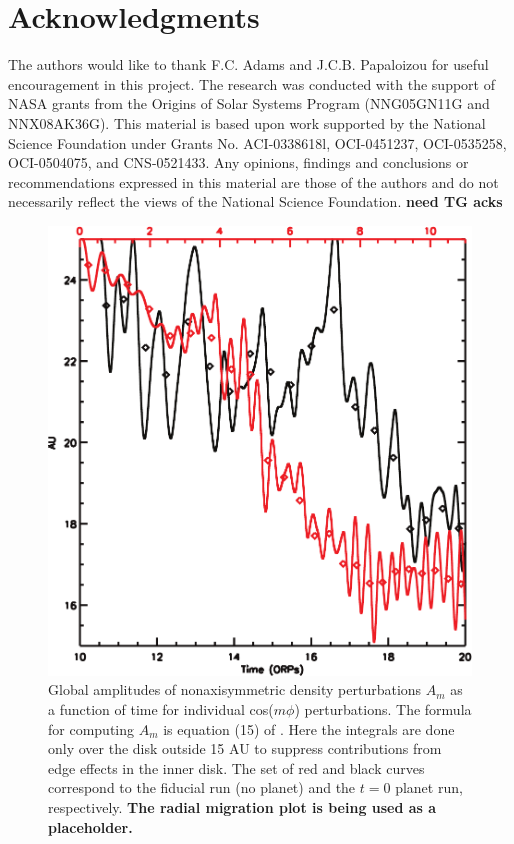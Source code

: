 \documentclass[12pt,manuscript,authoryear]{aastex}
\begin{document}
\section{Acknowledgments}

The authors would like to thank F.C. Adams and J.C.B. Papaloizou for useful encouragement in this project. The research was conducted with the support of NASA grants from the Origins of Solar Systems  Program (NNG05GN11G and NNX08AK36G). This material is based upon work supported by the National Science Foundation under Grants No. ACI-0338618l, OCI-0451237, OCI-0535258, OCI-0504075, and CNS-0521433. Any opinions, findings and conclusions or recommendations expressed in this material are those of the authors and do not necessarily reflect the views of the National Science Foundation. {\bf need TG acks}




\newpage

\begin{figure}[t]
\center
\includegraphics[width=12cm]{../Figures/planeta.pdf}
\caption{Global amplitudes of nonaxisymmetric density perturbations $A_m$ as a function of time for individual cos($m\phi$) perturbations. The formula for computing $A_m$ is equation (15) of \citep{boley2006}. Here the integrals are done only over the disk outside 15 AU to suppress contributions from edge effects in the inner disk. The set of red and black curves correspond to the fiducial run (no planet) and the $t = 0$ planet run, respectively. {\bf The radial migration plot is being used as a placeholder.}}
\label{fig:Am}
\end{figure}
\end{document}
